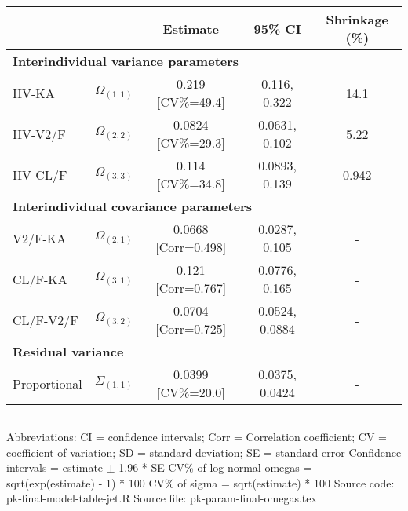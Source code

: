 \setlength{\tabcolsep}{5pt} 
\begin{threeparttable}
\renewcommand{\arraystretch}{1.3}
\begin{tabular}[h]{lcccc}
\hline
 &  & Estimate & 95\% CI & Shrinkage (\%) \\
\hline
\multicolumn{5}{l}{\textbf{Interindividual variance parameters}}\\
IIV-KA & $\Omega_{(1,1)}$ & 0.219 [CV\%=49.4] & 0.116, 0.322 & 14.1 \\
IIV-V2/F & $\Omega_{(2,2)}$ & 0.0824 [CV\%=29.3] & 0.0631, 0.102 & 5.22 \\
IIV-CL/F & $\Omega_{(3,3)}$ & 0.114 [CV\%=34.8] & 0.0893, 0.139 & 0.942 \\
\hline \multicolumn{5}{l}{\textbf{Interindividual covariance parameters}}\\
V2/F-KA & $\Omega_{(2,1)}$ & 0.0668 [Corr=0.498] & 0.0287, 0.105 & - \\
CL/F-KA & $\Omega_{(3,1)}$ & 0.121 [Corr=0.767] & 0.0776, 0.165 & - \\
CL/F-V2/F & $\Omega_{(3,2)}$ & 0.0704 [Corr=0.725] & 0.0524, 0.0884 & - \\
\hline \multicolumn{5}{l}{\textbf{Residual variance}}\\
Proportional & $\Sigma_{(1,1)}$ & 0.0399 [CV\%=20.0] & 0.0375, 0.0424 & - \\
\hline
\end{tabular}
\end{threeparttable}
\vskip 0.67cm
\begin{minipage}{1\linewidth}
\linespread{1.1}\selectfont
\rule{1\linewidth}{0.4pt}
\vskip 0.02cm
Abbreviations: CI = confidence intervals; 
                        Corr = Correlation coefficient;
                        CV = coefficient of variation;
                        SD = standard deviation;
                        SE = standard error \newline
Confidence intervals = estimate $\pm$ 1.96 * SE \newline
CV\% of log-normal omegas = sqrt(exp(estimate) - 1) * 100 \newline
CV\% of sigma = sqrt(estimate) * 100 \newline
Source code: pk-final-model-table-jet.R \newline
Source file: pk-param-final-omegas.tex \newline
\end{minipage}
